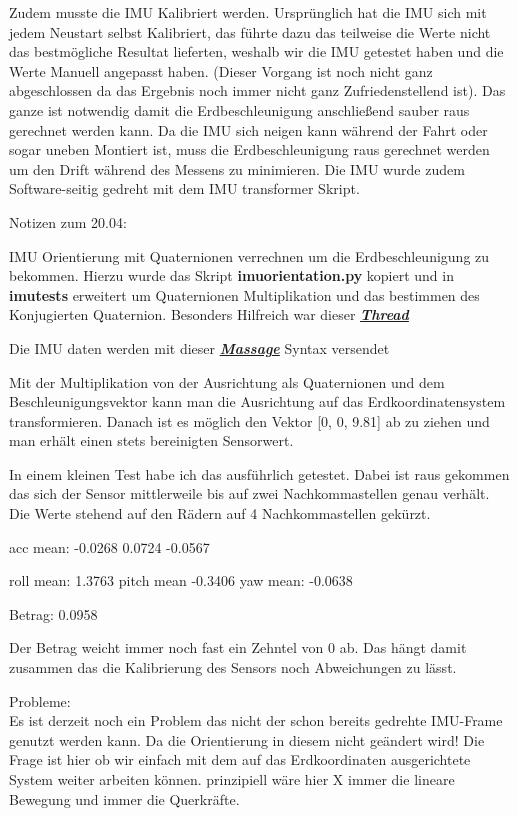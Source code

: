 Zudem musste die IMU Kalibriert werden. Ursprünglich hat die IMU sich mit jedem Neustart selbst Kalibriert, das führte dazu das teilweise die Werte nicht das bestmögliche Resultat lieferten, weshalb wir die IMU getestet haben und die Werte Manuell angepasst haben. (Dieser Vorgang ist noch nicht ganz abgeschlossen da das Ergebnis noch immer nicht ganz Zufriedenstellend ist). 
Das ganze ist notwendig damit die Erdbeschleunigung anschließend sauber raus gerechnet werden kann. Da die IMU sich neigen kann während der Fahrt oder sogar uneben Montiert ist, muss die Erdbeschleunigung raus gerechnet werden um den Drift während des Messens zu minimieren.
Die IMU wurde zudem Software-seitig gedreht mit dem IMU transformer Skript.

Notizen zum 20.04:

IMU Orientierung mit Quaternionen verrechnen um die Erdbeschleunigung zu bekommen. Hierzu wurde das Skript \textbf{imuorientation.py} kopiert und in \textbf{imutests} erweitert um Quaternionen Multiplikation und das bestimmen des Konjugierten Quaternion.
Besonders Hilfreich war dieser \href{https://stackoverflow.com/questions/60492369/gravity-compensation-in-imu-data}{\emph{\textbf{Thread}}}

Die IMU daten werden mit dieser \href{https://docs.ros.org/en/noetic/api/sensor_msgs/html/msg/Imu.html}{\emph{\textbf{Massage}}} Syntax versendet

Mit der Multiplikation von der Ausrichtung als Quaternionen und dem Beschleunigungsvektor kann man die Ausrichtung auf das Erdkoordinatensystem transformieren. Danach ist es möglich den Vektor [0, 0, 9.81] ab zu ziehen und man erhält einen stets bereinigten Sensorwert.

In einem kleinen Test habe ich das ausführlich getestet. Dabei ist raus gekommen das sich der Sensor mittlerweile bis auf zwei Nachkommastellen genau verhält.
Die Werte stehend auf den Rädern auf 4 Nachkommastellen gekürzt.

acc mean: -0.0268 0.0724 -0.0567

roll mean: 1.3763 pitch mean -0.3406 yaw mean: -0.0638

Betrag: 0.0958

Der Betrag weicht immer noch fast ein Zehntel von 0 ab. Das hängt damit zusammen das die Kalibrierung des Sensors noch Abweichungen zu lässt.

Probleme: \\
Es ist derzeit noch ein Problem das nicht der schon bereits gedrehte IMU-Frame genutzt werden kann. Da die Orientierung in diesem nicht geändert wird! Die Frage ist hier ob wir einfach mit dem auf das Erdkoordinaten ausgerichtete System weiter arbeiten können. prinzipiell wäre hier X immer die lineare Bewegung und immer die Querkräfte. 


